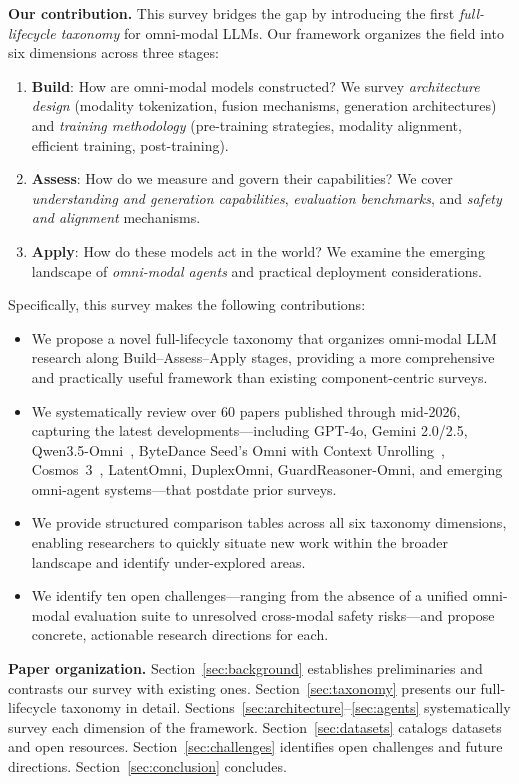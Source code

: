 \documentclass{article}
\begin{document}
\textbf{Our contribution.}
This survey bridges the gap by introducing the first \emph{full-lifecycle taxonomy} for omni-modal LLMs.
Our framework organizes the field into six dimensions across three stages:
\begin{enumerate}
    \item \textbf{Build}: How are omni-modal models constructed? We survey \emph{architecture design} (modality tokenization, fusion mechanisms, generation architectures) and \emph{training methodology} (pre-training strategies, modality alignment, efficient training, post-training).
    \item \textbf{Assess}: How do we measure and govern their capabilities? We cover \emph{understanding and generation capabilities}, \emph{evaluation benchmarks}, and \emph{safety and alignment} mechanisms.
    \item \textbf{Apply}: How do these models act in the world? We examine the emerging landscape of \emph{omni-modal agents} and practical deployment considerations.
\end{enumerate}

Specifically, this survey makes the following contributions:
\begin{itemize}
    \item We propose a novel full-lifecycle taxonomy that organizes omni-modal LLM research along Build--Assess--Apply stages, providing a more comprehensive and practically useful framework than existing component-centric surveys.
    \item We systematically review over 60 papers published through mid-2026, capturing the latest developments---including GPT-4o, Gemini 2.0/2.5, Qwen3.5-Omni~\cite{qwen2026omni}, ByteDance Seed's Omni with Context Unrolling~\cite{seed2026omni}, Cosmos~3~\cite{nvidia2026cosmos3}, LatentOmni, DuplexOmni, GuardReasoner-Omni, and emerging omni-agent systems---that postdate prior surveys.
    \item We provide structured comparison tables across all six taxonomy dimensions, enabling researchers to quickly situate new work within the broader landscape and identify under-explored areas.
    \item We identify ten open challenges---ranging from the absence of a unified omni-modal evaluation suite to unresolved cross-modal safety risks---and propose concrete, actionable research directions for each.
\end{itemize}

\textbf{Paper organization.}
Section~\ref{sec:background} establishes preliminaries and contrasts our survey with existing ones.
Section~\ref{sec:taxonomy} presents our full-lifecycle taxonomy in detail.
Sections~\ref{sec:architecture}--\ref{sec:agents} systematically survey each dimension of the framework.
Section~\ref{sec:datasets} catalogs datasets and open resources.
Section~\ref{sec:challenges} identifies open challenges and future directions.
Section~\ref{sec:conclusion} concludes.
\end{document}
